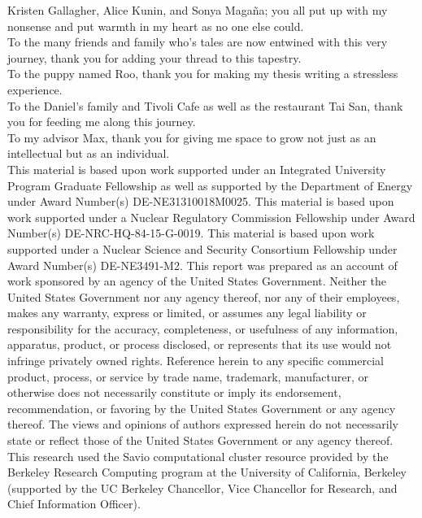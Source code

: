 \documentclass{ucbthesis}
\begin{document}
\begin{frontmatter}
\begin{acknowledgements}
\noindent Kristen Gallagher, Alice Kunin, and Sonya Maga\~{n}a; you all put 
up with my nonsense and put warmth in my heart as no one else could.\\

\noindent To the many friends and family who's tales are now entwined with this
very journey, thank you for adding your thread to this tapestry.\\

\noindent To the puppy named Roo, thank you for making my thesis writing a 
stressless experience.\\

\noindent To the Daniel's family and Tivoli Cafe as well as the restaurant Tai
San, thank you for feeding me along this journey.\\

\noindent To my advisor Max, thank you for giving me space to grow not just as 
an intellectual but as an individual.\\

\scriptsize{This material is based upon work supported under an Integrated
University Program Graduate Fellowship as well as supported by the Department 
of Energy under Award Number(s) DE-NE31310018M0025. 
This material is based upon work supported under a Nuclear Regulatory 
Commission Fellowship under Award Number(s) DE-NRC-HQ-84-15-G-0019. 
This material is based upon work supported under a Nuclear Science and Security 
Consortium Fellowship under Award Number(s) DE-NE3491-M2. 
This report was prepared as an account  of work sponsored by an agency of the 
United States Government. Neither the United 
States Government nor any agency thereof, nor any of their employees, makes any 
warranty, express or limited, or assumes any legal liability or responsibility for the 
accuracy, completeness, or usefulness of any information, apparatus, product, or
process disclosed, or represents that its use would not infringe privately owned
rights. Reference herein to any specific commercial product, process, or service by
trade name, trademark, manufacturer, or otherwise does not necessarily constitute or
imply its endorsement, recommendation, or favoring by the United States Government or
any agency thereof. The views and opinions of authors expressed herein do not 
necessarily state or reflect those of the United States Government or any agency 
thereof. This research used the Savio computational cluster resource provided by the 
Berkeley Research Computing program at the University of California, Berkeley 
(supported by the UC Berkeley Chancellor, Vice Chancellor for Research, and Chief 
Information Officer).}

\end{acknowledgements}

\end{frontmatter}
\end{document}
